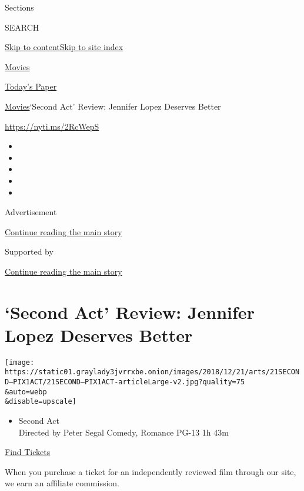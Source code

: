 Sections

SEARCH

\protect\hyperlink{site-content}{Skip to
content}\protect\hyperlink{site-index}{Skip to site index}

\href{https://www.nytimes3xbfgragh.onion/section/movies}{Movies}

\href{https://myaccount.nytimes3xbfgragh.onion/auth/login?response_type=cookie\&client_id=vi}{}

\href{https://www.nytimes3xbfgragh.onion/section/todayspaper}{Today's
Paper}

\href{/section/movies}{Movies}\textbar{}`Second Act' Review: Jennifer
Lopez Deserves Better

\url{https://nyti.ms/2RcWepS}

\begin{itemize}
\item
\item
\item
\item
\item
\end{itemize}

Advertisement

\protect\hyperlink{after-top}{Continue reading the main story}

Supported by

\protect\hyperlink{after-sponsor}{Continue reading the main story}

\hypertarget{second-act-review-jennifer-lopez-deserves-better}{%
\section{`Second Act' Review: Jennifer Lopez Deserves
Better}\label{second-act-review-jennifer-lopez-deserves-better}}

\texttt{[image: https://static01.graylady3jvrrxbe.onion/images/2018/12/21/arts/21SECOND--PIX1ACT/21SECOND--PIX1ACT-articleLarge-v2.jpg?quality=75\\\&auto=webp\\\&disable=upscale]}

\begin{itemize}
\tightlist
\item
  Second Act\\
  Directed by Peter Segal Comedy, Romance PG-13 1h 43m
\end{itemize}

\href{https://www.imdb.com/showtimes/title/tt2126357?ref_=ref_ext_NYT}{Find
Tickets}

When you purchase a ticket for an independently reviewed film through
our site, we earn an affiliate commission.

